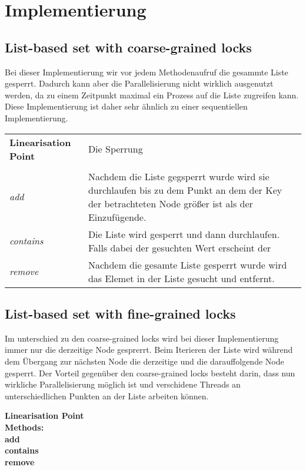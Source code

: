 \section{Implementierung}

\subsection{List-based set with coarse-grained locks}

Bei dieser Implementierung wir vor jedem Methodenaufruf die gesammte Liste gesperrt. Dadurch kann aber die Parallelisierung nicht wirklich ausgenutzt werden, da zu einem Zeitpunkt maximal ein Prozess auf die Liste zugreifen kann. Diese Implementierung ist daher sehr ähnlich zu einer sequentiellen Implementierung.

\begin{table}[H]
    \begin{tabularx}{\textwidth}{lX}
        \textbf{Linearisation Point} & Die Sperrung\\
        \\
        \textit{add} & Nachdem die Liste gegsperrt wurde wird sie durchlaufen bis zu dem Punkt an dem der Key der betrachteten Node größer ist als der Einzufügende.\\
        \textit{contains} & Die Liste wird gesperrt und dann durchlaufen. Falls dabei der gesuchten Wert erscheint der \\
        \textit{remove} & Nachdem die gesamte Liste gesperrt wurde wird das Elemet in der Liste gesucht und entfernt.\\
    \end{tabularx}
\end{table}

\subsection{List-based set with fine-grained locks}

Im unterschied zu den coarse-grained locks wird bei dieser Implementierung immer nur die derzeitige Node gesprerrt. Beim Iterieren der Liste wird während dem Übergang zur nächsten Node die derzeitige und die darauffolgende Node gesperrt. Der Vorteil gegenüber den coarse-grained locks besteht darin, dass nun wirkliche Parallelisierung möglich ist und verschidene Threads an unterschiedlichen Punkten an der Liste arbeiten können.

\textbf{Linearisation Point}\\
\textbf{Methods:}\\
\textbf{add}\\
\textbf{contains}\\
\textbf{remove}

